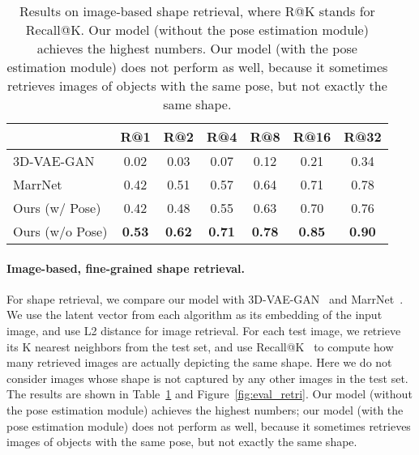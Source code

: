 \documentclass[10pt,twocolumn,letterpaper]{article}
\newcommand{\fig}[1]{Figure~\ref{#1}}
\newcommand{\tbl}[1]{Table~\ref{#1}}
\newcommand{\myparagraph}[1]{\vspace{-14pt}\paragraph{#1}}
\begin{document}
\begin{table}[t]
 	\centering
 	\setlength{\tabcolsep}{2pt}
    \begin{tabular}{lcccccc}
    \toprule
     & R@1 & R@2 & R@4 & R@8 & R@16 & R@32\\
    \midrule
    3D-VAE-GAN \cite{Wu2016Learning} & 0.02 & 0.03 & 0.07 & 0.12 & 0.21 & 0.34 \\
    MarrNet \cite{marrnet} & 0.42 & 0.51 & 0.57 & 0.64 & 0.71 & 0.78 \\
    Ours (w/ Pose) & 0.42 & 0.48 & 0.55 & 0.63 & 0.70 & 0.76 \\
    Ours (w/o Pose) & \textbf{0.53} & \textbf{0.62} & \textbf{0.71} & \textbf{0.78} & \textbf{0.85} & \textbf{0.90} \\
    \bottomrule
    \end{tabular}
    \vspace{-5pt}
    \caption{Results on image-based shape retrieval, where R@K stands for Recall@K. Our model (without the pose estimation module) achieves the highest numbers. Our model (with the pose estimation module) does not perform as well, because it sometimes retrieves images of objects with the same pose, but not exactly the same shape.} 
    \label{tbl:metric_retr}
    \vspace{-15pt}
\end{table}
 
\myparagraph{Image-based, fine-grained shape retrieval.}

For shape retrieval, we compare our model with 3D-VAE-GAN~\cite{Wu2016Learning} and MarrNet~\cite{marrnet}. We use the latent vector from each algorithm as its embedding of the input image, and use L2 distance for image retrieval. For each test image, we retrieve its K nearest neighbors from the test set, and use Recall@K~\cite{Jegou2011Product} to compute how many retrieved images are actually depicting the same shape. Here we do not consider images whose shape is not captured by any other images in the test set. The results are shown in \tbl{tbl:metric_retr} and \fig{fig:eval_retri}. Our model (without the pose estimation module) achieves the highest numbers; our model (with the pose estimation module) does not perform as well, because it sometimes retrieves images of objects with the same pose, but not exactly the same shape. 
\end{document}

